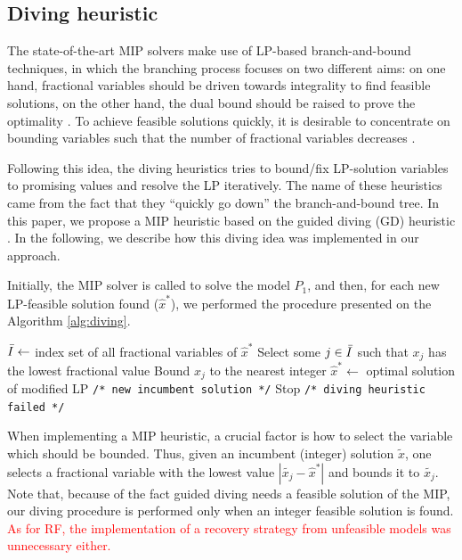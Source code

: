 \documentclass{ro}
\begin{document}
\subsection{Diving heuristic}

The state-of-the-art MIP solvers make use of  LP-based branch-and-bound techniques, in which the branching process focuses on two different aims:  on one hand, fractional variables should be driven towards integrality  to find feasible solutions, on the other hand, the dual bound should be raised  to prove the optimality \cite{achterberg2009hybrid}. To achieve feasible solutions quickly, it is desirable to concentrate on bounding variables such that the number of fractional variables decreases \cite{berthold2006primal}.

Following this idea, the diving heuristics tries  to bound/fix LP-solution variables to promising values and resolve the LP  iteratively. The name of these heuristics came from the fact that they ``quickly go down'' the branch-and-bound tree. In this paper, we propose a MIP heuristic based on the guided diving (GD) heuristic \cite{achterberg2005branching}. In the following, we describe how this diving idea was implemented in our approach.


Initially, the MIP solver is called to solve the model $P_1$, and then, for each new LP-feasible solution found ($\hat{x}^*$), we performed the procedure presented on  the Algorithm \ref{alg:diving}.



\begin{algorithm}[!h]
	\caption{\hspace{-1mm}\textbf{: Diving  }($\hat{x}^*$)}
	\label{alg:diving}
	{\footnotesize
		\begin{algorithmic}[1]	
			\STATE  $\Bar{I} \gets$ index set of all fractional variables of $\hat{x}^*$
			\STATE Select some $j \in \Bar{I}$ such that $x_j$ has the lowest fractional value
			\STATE Bound $x_j$ to the nearest integer
			\STATE $\hat{x}^* \gets $ optimal solution of modified LP \texttt{/* new incumbent solution */}
			\ELSE
			\STATE Stop \texttt{/* diving heuristic failed */}
			\ENDIF
			
		\end{algorithmic}
	}
\end{algorithm}

When implementing a MIP heuristic, a crucial factor is
how to select the variable which should be bounded. Thus,  given an incumbent (integer) solution $\tilde{x}$, one selects a fractional variable with the lowest
value $|\tilde{x_j} - \hat{x}^*|$ and bounds it to $\tilde{x_j}$. Note that, because of the fact guided diving needs a feasible solution of the MIP, our diving procedure is performed only when an integer feasible solution is found. \textcolor{red}{As for RF, the implementation of a recovery strategy from unfeasible models was unnecessary either.}
\end{document}
